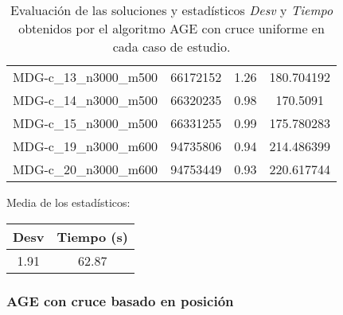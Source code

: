 \documentclass{article}
\begin{document}
\begin{table}[H]
\begin{tabular}{|cccc|}
		MDG-c\_13\_n3000\_m500 & 66172152 & 1.26 & 180.704192\\
		MDG-c\_14\_n3000\_m500 & 66320235 & 0.98 & 170.5091\\
		MDG-c\_15\_n3000\_m500 & 66331255 & 0.99 & 175.780283\\
		MDG-c\_19\_n3000\_m600 & 94735806 & 0.94 & 214.486399\\
		MDG-c\_20\_n3000\_m600 & 94753449 & 0.93 & 220.617744\\
		\hline
	\end{tabular}
	\caption{Evaluación de las soluciones y estadísticos \emph{Desv} y \emph{Tiempo} obtenidos por el algoritmo AGE con cruce uniforme
		en cada caso de estudio.}
	\label{tab:age-uniforme}
\end{table}

Media de los estadísticos:
\begin{table}[H]
	\centering
	\begin{tabular}{|cc|}
		\hline
		Desv & Tiempo (s)\\ \hline
		1.91 & 62.87 \\
		\hline
	\end{tabular}
\end{table}

\pagebreak

\subsubsection*{AGE con cruce basado en posición}
\end{document}
